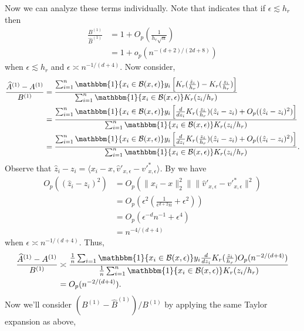 \documentclass[11pt]{article}
\begin{document}
Now we can analyze these terms individually. Note that  indicates that if $\epsilon \lesssim h_r$ then
\begin{align*}
    \frac{B^{(1)}}{\widehat{B}^{(1)}} &= 1  + O_p\left(\frac{1}{h_r\sqrt{n}}\right) \\
    &= 1  + o_p\left(n^{-(d+2)/(2d+8)}\right)
\end{align*}
when $\epsilon \lesssim h_r$ and $\epsilon \asymp n^{-1/(d+4)}$. Now consider,
\begin{align}
    \frac{\widehat{A}^{(1)} - A^{(1)}}{B^{(1)}} &= \frac{\sum_{i=1}^n\mathbbm{1}\{x_i \in \mathcal{B}(x, \epsilon)\}y_i\left[K_r(\frac{\hat{z}_i}{h_r}) - K_r(\frac{z_i}{h_r})\right]}{\sum_{i = 1}^n\mathbbm{1}\{x_i \in \mathcal{B}(x, \epsilon)\}K_r(z_i/h_r)} \\
    &= \frac{\sum_{i=1}^n\mathbbm{1}\{x_i \in \mathcal{B}(x, \epsilon)\}y_i\left[\frac{d}{dz_i}K_r(\frac{z_i}{h_r})(\hat{z}_i - z_i) + O_p((\hat{z}_i - z_i)^2)\right]}{\sum_{i = 1}^n\mathbbm{1}\{x_i \in \mathcal{B}(x, \epsilon)\}K_r(z_i/h_r)} \\
    &= \frac{\sum_{i=1}^n\mathbbm{1}\{x_i \in \mathcal{B}(x, \epsilon)\}y_i\left[\frac{d}{dz_i}K_r(\frac{z_i}{h_r})(\hat{z}_i - z_i) + O_p((\hat{z}_i - z_i)^2)\right]}{\sum_{i = 1}^n\mathbbm{1}\{x_i \in \mathcal{B}(x, \epsilon)\}K_r(z_i/h_r)}.
\end{align}
Observe that $\hat{z}_i - z_i = \langle x_i - x, \hat{v}'_{x, \epsilon} - v'^*_{x, \epsilon}\rangle$. By  we have
\begin{align*}
    O_p((\hat{z}_i - z_i)^2) &= O_p(\|x_i-x\|_2^2\|\|\hat{v}'_{x, \epsilon} - v'^*_{x, \epsilon}\|^2) \\
    &= O_p\left(\epsilon^2\left(\frac{1}{\epsilon^{d+2}n} + \epsilon^2\right) \right) \\
    &= O_p(\epsilon^{-d}n^{-1} + \epsilon^4) \\
    &= n^{-4/(d+4)}
\end{align*}
when $\epsilon \asymp n^{-1/(d+4)}.$ Thus,
\begin{align}
    \frac{\widehat{A}^{(1)} - A^{(1)}}{B^{(1)}} &\asymp \frac{\frac{1}{n}\sum_{i = 1}\mathbbm{1}\{x_i \in \mathcal{B}(x, \epsilon)\}y_i\frac{d}{dz_i}K_r(\frac{z_i}{h_r})O_p(n^{-2/(d+4)})}{\frac{1}{n}\sum_{i = 1}^n\mathbbm{1}\{x_i \in \mathcal{B}(x, \epsilon)\}K_r(z_i/h_r)} \\
    &= O_p(n^{-2/(d+4)}).
\end{align}
Now we'll consider $(B^{(1)} - \widehat{B}^{(1)})/B^{(1)}$ by applying the same Taylor expansion as above,
\end{document}

